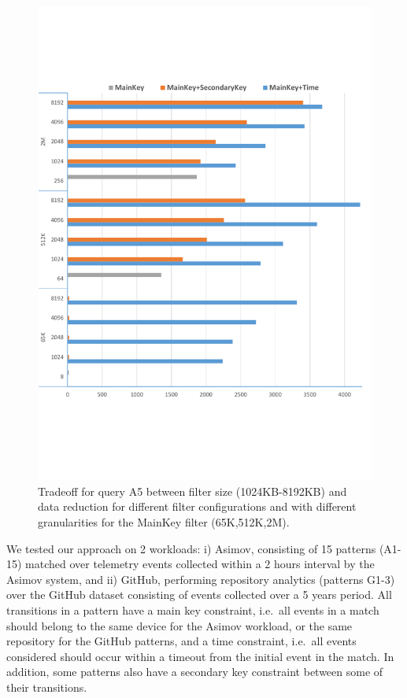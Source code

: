 \begin{figure}[tp]
\centering

\includegraphics[clip, trim=0cm 3.8cm 0.3cm 10cm,
width=\columnwidth]{graphs/A5_tradeoff.pdf}
\caption{Tradeoff for query A5 between filter size (1024KB-8192KB) and data
reduction for different filter configurations and with different granularities
for the MainKey filter (65K,512K,2M).}
\label{fig:tradeoff}
\end{figure}




We tested our approach on 2 workloads:
i) Asimov, consisting of 15 patterns (A1-15) matched over telemetry events
collected within a 2 hours interval by the Asimov system, and 
ii) GitHub, performing repository analytics (patterns G1-3) over the GitHub
dataset consisting of events collected over a 5 years period.
All transitions in a pattern have a main key constraint, i.e.\ all events in a
match should belong to the same device for the Asimov workload, or the same
repository for the GitHub patterns, and a time constraint, i.e.\ all events 
considered should occur within a timeout from the initial event in the match.
In addition, some patterns also have a secondary key constraint between some of
their transitions.

